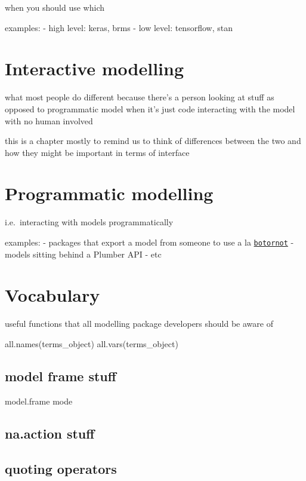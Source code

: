 \documentclass[]{book}
\theoremstyle{definition}
\theoremstyle{definition}
\theoremstyle{definition}
\theoremstyle{remark}
\begin{document}
when you should use which

examples: - high level: keras, brms - low level: tensorflow, stan

\chapter{Interactive modelling}\label{interactive-modelling}

what most people do different because there's a person looking at stuff
as opposed to programmatic model when it's just code interacting with
the model with no human involved

this is a chapter mostly to remind us to think of differences between
the two and how they might be important in terms of interface

\chapter{Programmatic modelling}\label{programmatic-modelling}

i.e.~interacting with models programmatically

examples: - packages that export a model from someone to use a la
\href{https://github.com/mkearney/tweetbotornot}{\texttt{botornot}} -
models sitting behind a Plumber API - etc

\chapter{Vocabulary}\label{vocabulary}

useful functions that all modelling package developers should be aware
of

all.names(terms\_object) all.vars(terms\_object)

\section{model frame stuff}\label{model-frame-stuff}

model.frame mode

\section{na.action stuff}\label{na.action-stuff}

\section{quoting operators}\label{quoting-operators}
\end{document}
